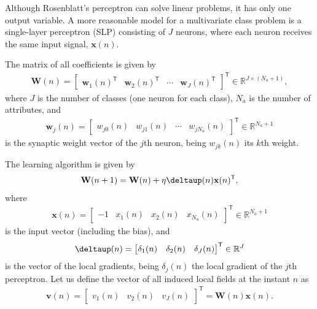 \documentclass[12pt,a4paper]{article}
\newcommand{\trans}{\mathsf{T}}
\newcommand{\Real}{\mathbb{R}}
\begin{document}
Although Rosenblatt's perceptron can solve linear problems, it has only one output variable. A more reasonable model for a multivariate class problem is a single-layer perceptron (SLP) consisting of \(J\) neurons, where each neuron receives the same input signal, \(\mathbf{x}(n)\).

The matrix of all coefficients is given by
\begin{align}
    \mathbf{W}(n) = \begin{bmatrix}
        \mathbf{w}_1 (n)^\trans & \mathbf{w}_2 (n)^\trans & \cdots & \mathbf{w}_J (n)^\trans
    \end{bmatrix}^\trans \in \Real^{J \times \left(N_a+1\right)},
\end{align}
where \(J\) is the number of classes (one neuron for each class), \(N_a\) is the number of attributes, and
\begin{align}
    \mathbf{w}_j (n) = \begin{bmatrix}
        w_{j0} (n) & w_{j1} (n) & \cdots & w_{j N_a} (n)
    \end{bmatrix}^\trans \in \Real^{N_a+1}
\end{align}
is the synaptic weight vector of the \(j\)th neuron, being \(w_{jk} (n)\) its \(k\)th weight.

The learning algorithm is given by
\begin{align}
    \mathbf{W}(n+1) = \mathbf{W}(n) + \eta \boldsymbol{\deltaup}(n) \mathbf{x}(n)^\trans,
\end{align}
where
\begin{align}
    \mathbf{x}(n) = \begin{bmatrix}
        -1 & x_1(n) & x_2(n) & x_{N_a}(n)
    \end{bmatrix}^\trans \in \Real^{N_a+1}
\end{align}
is the input vector (including the bias), and
\begin{align}
    \boldsymbol{\deltaup}(n) = \begin{bmatrix}
        \delta_1(n) & \delta_2(n) & \delta_J(n)
    \end{bmatrix}^\trans \in \Real^{J}
\end{align}
is the vector of the local gradients, being \(\delta_j(n)\) the local gradient of the \(j\)th perceptron. Let us define the vector of all induced local fields at the instant \(n\) as
\begin{align}
    \mathbf{v}(n) = \begin{bmatrix}
        v_1(n) & v_2(n) & v_J(n)
    \end{bmatrix}^\trans = \mathbf{W}(n) \mathbf{x}(n).
\end{align}
\end{document}
